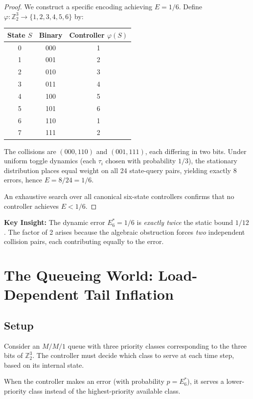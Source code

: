 \documentclass[11pt]{article}
\begin{document}
\begin{proof}
We construct a specific encoding achieving $E = 1/6$. Define $\varphi: \mathbb{Z}_2^3 \to \{1,2,3,4,5,6\}$ by:

\begin{table}[h]
\centering
\begin{tabular}{ccc}
\toprule
State $S$ & Binary & Controller $\varphi(S)$ \\
\midrule
0 & 000 & 1 \\
1 & 001 & 2 \\
2 & 010 & 3 \\
3 & 011 & 4 \\
4 & 100 & 5 \\
5 & 101 & 6 \\
6 & 110 & 1 \\
7 & 111 & 2 \\
\bottomrule
\end{tabular}
\end{table}

The collisions are $(000, 110)$ and $(001, 111)$, each differing in two bits. Under uniform toggle dynamics (each $\tau_i$ chosen with probability $1/3$), the stationary distribution places equal weight on all 24 state-query pairs, yielding exactly 8 errors, hence $E = 8/24 = 1/6$.

An exhaustive search over all canonical six-state controllers confirms that no controller achieves $E < 1/6$.
\end{proof}

\textbf{Key Insight:} The dynamic error $E_6^* = 1/6$ is \textit{exactly twice} the static bound $1/12$. The factor of 2 arises because the algebraic obstruction forces \textit{two} independent collision pairs, each contributing equally to the error.

\section{The Queueing World: Load-Dependent Tail Inflation}

\subsection{Setup}

Consider an $M/M/1$ queue with three priority classes corresponding to the three bits of $\mathbb{Z}_2^3$. The controller must decide which class to serve at each time step, based on its internal state.

When the controller makes an error (with probability $p = E_6^*$), it serves a lower-priority class instead of the highest-priority available class.
\end{document}
